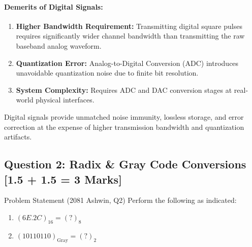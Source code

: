 \documentclass[11pt,a4paper,oneside]{book}
\begin{document}
\paragraph{Demerits of Digital Signals:}
\begin{enumerate}
  \item \textbf{Higher Bandwidth Requirement:} Transmitting digital square pulses requires significantly wider channel bandwidth than transmitting the raw baseband analog waveform.
  \item \textbf{Quantization Error:} Analog-to-Digital Conversion (ADC) introduces unavoidable quantization noise due to finite bit resolution.
  \item \textbf{System Complexity:} Requires ADC and DAC conversion stages at real-world physical interfaces.
\end{enumerate}

\begin{answerbox}
Digital signals provide unmatched noise immunity, lossless storage, and error correction at the expense of higher transmission bandwidth and quantization artifacts.
\end{answerbox}

\vspace{0.6cm}

\subsection{Question 2: Radix \& Gray Code Conversions [1.5 + 1.5 = 3 Marks]}
\begin{questionbox}{Problem Statement (2081 Ashwin, Q2)}
Perform the following as indicated:
\begin{enumerate}[label=(\alph*)]
  \item $(6E.2C)_{16} = (?)_{8}$
  \item $(10110110)_{\text{Gray}} = (?)_{2}$
\end{enumerate}
\end{questionbox}
\end{document}
